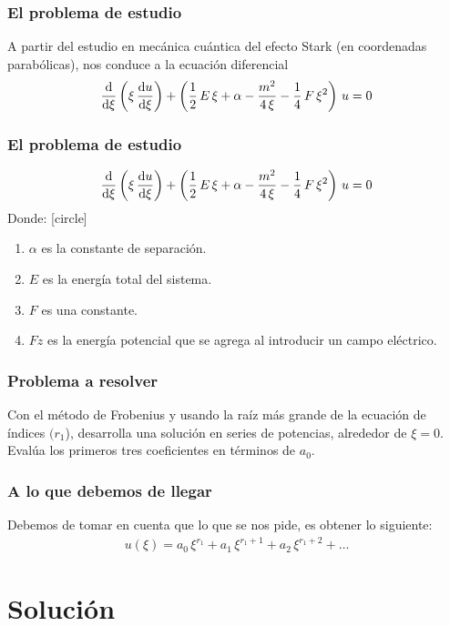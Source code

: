 \documentclass[12pt]{beamer}
\begin{document}
\begin{frame}
\frametitle{El problema de estudio}
A partir del estudio en mecánica cuántica del efecto Stark (en coordenadas parabólicas), nos conduce a la ecuación diferencial
\begin{align*}
\dv{\xi} \left( \xi\, \dv{u}{\xi} \right) + \left( \dfrac{1}{2} \, E \, \xi + \alpha - \dfrac{m^{2}}{4 \, \xi} - \dfrac{1}{4} \, F \, \xi^{2} \right) \, u = 0
\end{align*}
\end{frame}
\begin{frame}
\frametitle{El problema de estudio}
\begin{align*}
\dv{\xi} \left( \xi\, \dv{u}{\xi} \right) + \left( \dfrac{1}{2} \, E \, \xi + \alpha - \dfrac{m^{2}}{4 \, \xi} - \dfrac{1}{4} \, F \, \xi^{2} \right) \, u = 0
\end{align*}
\pause
Donde:
[circle]
\begin{enumerate}[<+->]
\item $\alpha$ es la constante de separación.
\item $E$ es la energía total del sistema.
\item $F$ es una constante.
\item $Fz$ es la energía potencial que se agrega al introducir un campo eléctrico.
\end{enumerate}
\end{frame}
\begin{frame}
\frametitle{Problema a resolver}
Con el método de Frobenius y usando la raíz más grande de la ecuación de índices $(r_{1}$), desarrolla una solución en series de potencias, alrededor de $\xi=0$.
\\
\bigskip
\pause
Evalúa los primeros tres coeficientes en términos de $a_{0}$.
\end{frame}
\begin{frame}
\frametitle{A lo que debemos de llegar}
Debemos de tomar en cuenta que lo que se nos pide, es obtener lo siguiente:
\begin{align*}
u(\xi) = a_{0} \, \xi^{r_{1}} + a_{1} \, \xi ^{r_{1}+1} + a_{2} \, \xi ^{r_{1}+2} + \ldots 
\end{align*}
\end{frame}

\section{Solución}
\end{document}
